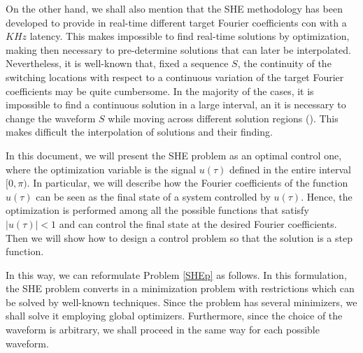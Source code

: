 On the other hand, we shall also mention that the SHE methodology has been developed to provide in real-time different target Fourier coefficients con with a $KHz$ latency. 
%
This makes impossible to find real-time solutions by optimization, making then necessary to pre-determine solutions that can later be interpolated.
%
Nevertheless, it is well-known that, fixed a sequence $S$, the continuity of the switching locations with respect to a continuous variation of the target Fourier coefficients may be quite cumbersome. 
%
In the majority of the cases, it is impossible to find a continuous solution in a large interval, an it is necessary to change the waveform $S$ while moving across different solution regions (\cite{Yang2015,Yang2017}). This makes difficult the interpolation of solutions and their finding.

In this document, we will present the SHE problem as an optimal control one, where the optimization variable is the signal $u(\tau)$ defined in the entire interval $[0,\pi)$. 
%
In particular, we will describe how the Fourier coefficients of the function $u(\tau)$ can be seen as the final state of a system controlled by $u (\tau)$. Hence, the optimization is performed among all the possible functions that satisfy $|u(\tau)|<1 $ and can control the final state at the desired Fourier coefficients. Then we will show how to design a control problem so that the solution is a step function.

In this way, we can reformulate Problem \ref{SHEp} as follows.
\newline
In this formulation, the SHE problem converts in a minimization problem with restrictions which can be solved by well-known techniques. Since the problem has several minimizers, we shall solve it employing global optimizers. Furthermore, since the choice of the waveform is arbitrary, we shall proceed in the same way for each possible waveform. 

{\color{red}{
    Tengo que enlazar estas sección con la formulacion de control óptimo.
}}